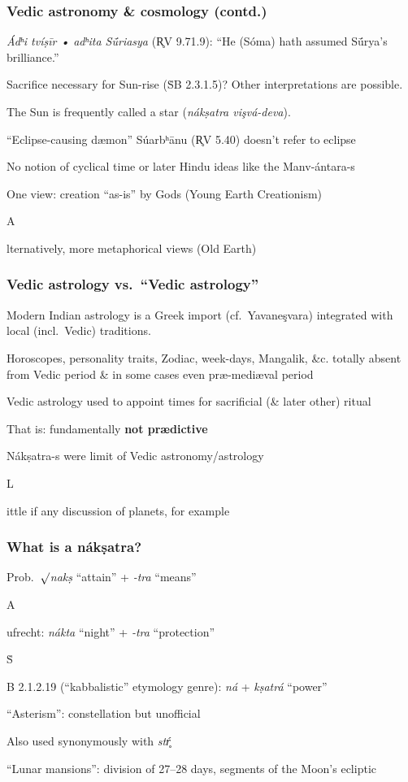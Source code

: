 \documentclass[pdf]{beamer}
\newcommand{\Subitem}[1]{{\setlength\itemindent{12pt} \item[-] #1}}
\begin{document}
\begin{frame} \frametitle{Vedic astronomy \& cosmology (contd.)}
\begin{itemize}
	\item \textit{Ádʰi tvíṣīr • adʰita Sū́riasya} (R̥V 9.71.9): ``He (Sóma) hath assumed Sū́rya's brilliance.''
	\item Sacrifice necessary for Sun-rise (ṠB 2.3.1.5)?  Other interpretations are possible.
	\item The Sun is frequently called a star (\textit{nákṣatra vişvá-deva}).
	\item ``Eclipse-causing dæmon'' Súarbʰānu (R̥V 5.40) doesn't refer to eclipse
	\item No notion of cyclical time or later Hindu ideas like the Manv-ántara-s
	\item One view: creation ``as-is'' by Gods (Young Earth Creationism)
	\Subitem Alternatively, more metaphorical views (Old Earth)
\end{itemize}
\end{frame}

\begin{frame} \frametitle{Vedic astrology vs.~``Vedic astrology''}
\begin{itemize}
	\item Modern Indian astrology is a Greek import (cf.~Yavaneşvara) integrated with local (incl.~Vedic) traditions.
	\item Horoscopes, personality traits, Zodiac, week-days, Mangalik, \&c. totally absent from Vedic period \& in some cases even præ-mediæval period
	\item Vedic astrology used to appoint times for sacrificial (\& later other) ritual
	\item That is: fundamentally \textbf{not prædictive}
	\item Nákṣatra-s were limit of Vedic astronomy/astrology
	\Subitem Little if any discussion of planets, for example
\end{itemize}
\end{frame}

\begin{frame} \frametitle{What is a nákṣatra?}
\begin{itemize}
	\item Prob.~$\surd$\textit{nakṣ} ``attain'' + \textit{-tra} ``means''
	\Subitem Aufrecht: \textit{nákta} ``night'' + \textit{-tra} ``protection''
	\Subitem ṠB 2.1.2.19 (``kabbalistic'' etymology genre): \textit{ná} + \textit{kṣatrá} ``power''
	\item ``Asterism'': constellation but unofficial
	\item Also used synonymously with \textit{stŕ̥}
	\item ``Lunar mansions'': division of 27--28 days, segments of the Moon's ecliptic
\end{itemize}
\end{frame}
\end{document}
